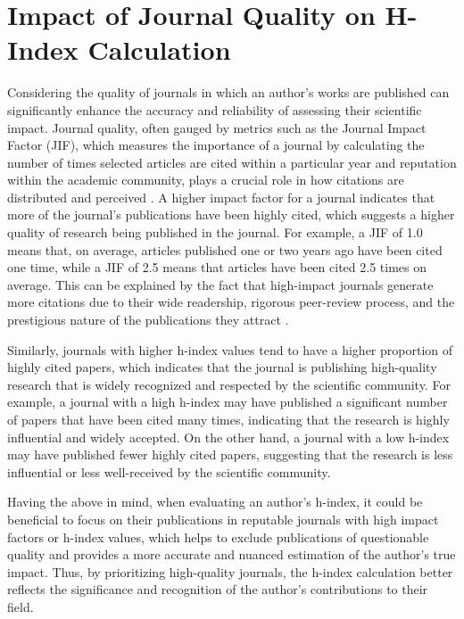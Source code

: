 \section{Impact of Journal Quality on H-Index Calculation}
Considering the quality of journals in which an author's works are published
can significantly enhance the accuracy and reliability of assessing their
scientific impact. Journal quality, often gauged by metrics such as the Journal
Impact Factor (JIF), which measures the importance of a journal by calculating
the number of times selected articles are cited within a particular year and
reputation within the academic community, plays a crucial role in how citations
are distributed and perceived \cite{garfield1999journal, garfield2006history}.
A higher impact factor for a journal indicates that more of the journal's
publications have been highly cited, which suggests a higher quality of
research being published in the journal. For example, a JIF of 1.0 means that,
on average, articles published one or two years ago have been cited one time,
while a JIF of 2.5 means that articles have been cited 2.5 times on average.
This can be explained by the fact that high-impact journals generate more
citations due to their wide readership, rigorous peer-review process, and the
prestigious nature of the publications they attract \cite{garfield2006history}.

Similarly, journals with higher h-index values tend to have a higher proportion
of highly cited papers, which indicates that the journal is publishing
high-quality research that is widely recognized and respected by the scientific
community. For example, a journal with a high h-index may have published a
significant number of papers that have been cited many times, indicating that
the research is highly influential and widely accepted. On the other hand, a
journal with a low h-index may have published fewer highly cited papers,
suggesting that the research is less influential or less well-received by the
scientific community.

Having the above in mind, when evaluating an author's h-index, it could be
beneficial to focus on their publications in reputable journals with high
impact factors or h-index values, which helps to exclude publications of
questionable quality and provides a more accurate and nuanced estimation of the
author's true impact. Thus, by prioritizing high-quality journals, the h-index
calculation better reflects the significance and recognition of the author's
contributions to their field.

